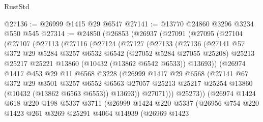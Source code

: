 \begin{lexlean}{RustStd}
\begin{coremodule}
@27136 := @26999 @1415 @29 @6547
@27141 := @13770 @24860 @3296 @3234 @550 @545
@27314 := @24850
    (@26853
      (@26937
        (@27091
          (@27095
            (@27104
              (@27107
                (@27113
                  (@27116
                    (@27124
                      (@27127
                        (@27133
                          (@27136
                            (@27141
                              @57
                              @372
                              @29
                              @5284
                              @3257
                              @6532
                              @6542
                              (@27052 @5284 @27055 @25208)
                              @25213
                              @25217
                              @25221
                              @13860
                              (@10432 (@13862 @6542 @6533))
                              @13693))
                          (@26974
                            @1417
                            @453
                            @29
                            @11
                            @6568
                            @3228
                            (@26999
                              @1417
                              @29
                              @6568
                              (@27141
                                @67
                                @372
                                @29
                                @3501
                                @3257
                                @6552
                                @6563
                                @27057
                                @25213
                                @25217
                                @25254
                                @13860
                                (@10432 (@13862 @6563 @6553))
                                @13693))
                            @27071)))
                      @25273))
                  (@26974
                    @1424
                    @618
                    @220
                    @198
                    @5337
                    @3711
                    (@26999
                      @1424
                      @220
                      @5337
                      (@26956
                        @754
                        @220
                        @1423
                        @261
                        @3269
                        @25291
                        @4064
                        @14939
                        (@26969
                          @1423

\end{coremodule}
\end{lexlean}
